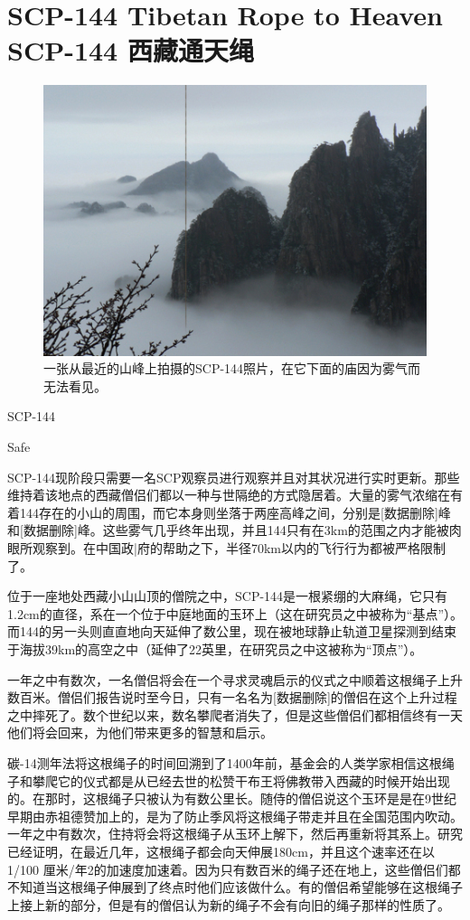 \chapter[SCP-144 西藏通天绳]{
    SCP-144 Tibetan Rope to Heaven\\
    SCP-144 西藏通天绳
}

\label{chap:SCP-144}

\begin{figure}[H]
    \centering
    \includegraphics[width=0.5\linewidth]{images/SCP.144.jpg}
    \caption*{一张从最近的山峰上拍摄的SCP-144照片，在它下面的庙因为雾气而无法看见。}
\end{figure}

SCP-144

Safe

SCP-144现阶段只需要一名SCP观察员进行观察并且对其状况进行实时更新。那些维持着该地点的西藏僧侣们都以一种与世隔绝的方式隐居着。大量的雾气浓缩在有着144存在的小山的周围，而它本身则坐落于两座高峰之间，分别是{[}数据删除]峰和{[}数据删除]峰。这些雾气几乎终年出现，并且144只有在3km的范围之内才能被肉眼所观察到。在中国政|府的帮助之下，半径70km以内的飞行行为都被严格限制了。

位于一座地处西藏小山山顶的僧院之中，SCP-144是一根紧绷的大麻绳，它只有1.2cm的直径，系在一个位于中庭地面的玉环上（这在研究员之中被称为“基点”）。而144的另一头则直直地向天延伸了数公里，现在被地球静止轨道卫星探测到结束于海拔39km的高空之中（延伸了22英里，在研究员之中这被称为“顶点”）。

一年之中有数次，一名僧侣将会在一个寻求灵魂启示的仪式之中顺着这根绳子上升数百米。僧侣们报告说时至今日，只有一名名为{[}数据删除]的僧侣在这个上升过程之中摔死了。数个世纪以来，数名攀爬者消失了，但是这些僧侣们都相信终有一天他们将会回来，为他们带来更多的智慧和启示。

碳-14测年法将这根绳子的时间回溯到了1400年前，基金会的人类学家相信这根绳子和攀爬它的仪式都是从已经去世的松赞干布王将佛教带入西藏的时候开始出现的。在那时，这根绳子只被认为有数公里长。随侍的僧侣说这个玉环是是在9世纪早期由赤祖德赞加上的，是为了防止季风将这根绳子带走并且在全国范围内吹动。一年之中有数次，住持将会将这根绳子从玉环上解下，然后再重新将其系上。研究已经证明，在最近几年，这根绳子都会向天伸展180cm，并且这个速率还在以1\slash 100 厘米\slash 年2的加速度加速着。因为只有数百米的绳子还在地上，这些僧侣们都不知道当这根绳子伸展到了终点时他们应该做什么。有的僧侣希望能够在这根绳子上接上新的部分，但是有的僧侣认为新的绳子不会有向旧的绳子那样的性质了。

